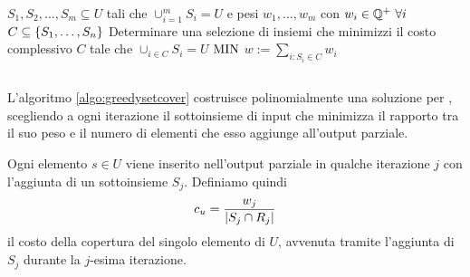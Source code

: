 \popt{\MinSetCover}
{$S_1,S_2,\dots,S_m\subseteq U$ tali che $\cup_{i=1}^m S_i=U$ e pesi $w_1,\dots,w_m$ con $w_i \in\mathbb Q^+~\forall i$}
{$C\subseteq\left\{ S_1,\dots,S_n \right\}$}
{Determinare una selezione di insiemi che minimizzi il costo complessivo}
{$C$ tale che $\cup_{i\in C}S_i=U$}
{$\mathrm{MIN}$}
{$w:=\sum_{i:S_i\in C} w_i$}


\subsection{\GreedySetCover}
\begin{algorithm}[ht]
	\caption{\GreedySetCover}
	\label{algo:greedysetcover}
	
\end{algorithm}
L'algoritmo \ref{algo:greedysetcover} costruisce polinomialmente una soluzione per \MinSetCover, scegliendo a ogni iterazione il sottoinsieme di input che minimizza il rapporto tra il suo peso e il numero di elementi che esso aggiunge all'output parziale.

Ogni elemento $s\in U$ viene inserito nell'output parziale in qualche iterazione $j$ con l'aggiunta di un sottoinsieme $S_j$. Definiamo quindi
\begin{equation*}
	c_u = \frac{w_j}{| S_j\cap R_j |}
\end{equation*}
il costo della copertura del singolo elemento di $U$, avvenuta tramite l'aggiunta di $S_j$ durante la $j$-esima iterazione.

